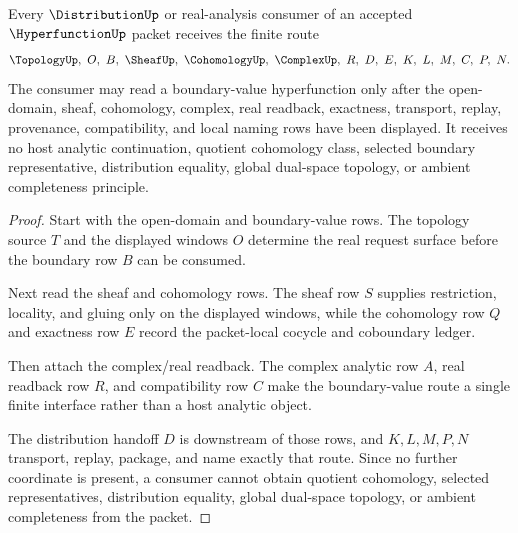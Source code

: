 
\begin{theorem}
\label{thm:hyperfunction-sheaf-cohomology-handoff}
Every $\DistributionUp$ or real-analysis consumer of an accepted $\HyperfunctionUp$ packet receives the finite route
$$
\TopologyUp,\ O,\ B,\ \SheafUp,\ \CohomologyUp,\ \ComplexUp,\ R,\ D,\ E,\ K,\ L,\ M,\ C,\ P,\ N .
$$
The consumer may read a boundary-value hyperfunction only after the open-domain, sheaf, cohomology, complex, real readback, exactness, transport, replay, provenance, compatibility, and local naming rows have been displayed. It receives no host analytic continuation, quotient cohomology class, selected boundary representative, distribution equality, global dual-space topology, or ambient completeness principle.
\end{theorem}
\begin{proof}
Start with the open-domain and boundary-value rows. The topology source $T$ and the displayed windows $O$ determine the real request surface before the boundary row $B$ can be consumed.

Next read the sheaf and cohomology rows. The sheaf row $S$ supplies restriction, locality, and gluing only on the displayed windows, while the cohomology row $Q$ and exactness row $E$ record the packet-local cocycle and coboundary ledger.

Then attach the complex/real readback. The complex analytic row $A$, real readback row $R$, and compatibility row $C$ make the boundary-value route a single finite interface rather than a host analytic object.

The distribution handoff $D$ is downstream of those rows, and $K,L,M,P,N$ transport, replay, package, and name exactly that route. Since no further coordinate is present, a consumer cannot obtain quotient cohomology, selected representatives, distribution equality, global dual-space topology, or ambient completeness from the packet.
\end{proof}

